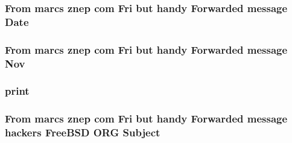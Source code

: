 \subsubsection[{\texorpdfstring{Date}{Date}}]{\setlength{\rightskip}{0pt plus 5cm}From marcs znep com Fri but handy Forwarded {\bf message} Date}\hypertarget{tcpdumpscii_8txt_a922f0e1dba25fa21a1e033cbacf6d6e7}{}\label{tcpdumpscii_8txt_a922f0e1dba25fa21a1e033cbacf6d6e7}
\subsubsection[{\texorpdfstring{Nov}{Nov}}]{\setlength{\rightskip}{0pt plus 5cm}From marcs znep com Fri but handy Forwarded {\bf message} Nov}\hypertarget{tcpdumpscii_8txt_a47fd35ffab23ee50b590f5c3e30dcc6b}{}\label{tcpdumpscii_8txt_a47fd35ffab23ee50b590f5c3e30dcc6b}
\subsubsection[{\texorpdfstring{print}{print}}]{\setlength{\rightskip}{0pt plus 5cm}print}\hypertarget{tcpdumpscii_8txt_a3ad3a4240c0f97c7e85aff5c52a454d4}{}\label{tcpdumpscii_8txt_a3ad3a4240c0f97c7e85aff5c52a454d4}
\subsubsection[{\texorpdfstring{Subject}{Subject}}]{\setlength{\rightskip}{0pt plus 5cm}From marcs znep com Fri but handy Forwarded {\bf message} hackers Free\+B\+SD O\+RG Subject}\hypertarget{tcpdumpscii_8txt_a1f224259352450ebe38093f1e8a81be1}{}\label{tcpdumpscii_8txt_a1f224259352450ebe38093f1e8a81be1}
